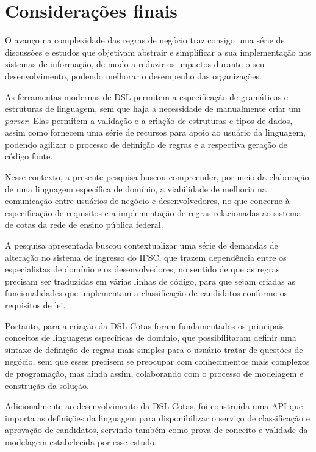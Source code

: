 \section{Considerações finais}
\label{considfinal}

O avanço na complexidade das regras de negócio traz consigo uma série de discussões e estudos que objetivam abstrair e simplificar a sua implementação nos sistemas de informação, de modo a reduzir os impactos durante o seu desenvolvimento, podendo melhorar o desempenho das organizações.

As ferramentas modernas de \gls{DSL} permitem a especificação de gramáticas e estruturas de linguagem, sem que haja a necessidade de manualmente criar um \textit{parser}. Elas permitem a validação e a criação de estruturas e tipos de dados, assim como fornecem uma série de recursos para apoio ao usuário da linguagem, podendo agilizar o processo de definição de regras e a respectiva geração de código fonte.

Nesse contexto, a presente pesquisa buscou compreender, por meio da elaboração de uma linguagem específica de domínio, a viabilidade de melhoria na comunicação entre usuários de negócio e desenvolvedores, no que concerne à especificação de requisitos e a implementação de regras relacionadas ao sistema de cotas da rede de ensino pública federal.

A pesquisa apresentada buscou contextualizar uma série de demandas de alteração no sistema de ingresso do \gls{IFSC}, que trazem dependência entre os especialistas de domínio e os desenvolvedores, no sentido de que as regras precisam ser traduzidas em várias linhas de código, para que sejam criadas as funcionalidades que implementam a classificação de candidatos conforme os requisitos de lei.

Portanto, para a criação da DSL Cotas foram fundamentados os principais conceitos de linguagens específicas de domínio, que possibilitaram definir uma sintaxe de definição de regras mais simples para o usuário tratar de questões de negócio, sem que esses precisem se preocupar com conhecimentos mais complexos de programação, mas ainda assim, colaborando com o processo de modelagem e construção da solução.

Adicionalmente ao desenvolvimento da DSL Cotas, foi construída uma \gls{API} que importa as definições da linguagem para disponibilizar o serviço de classificação e aprovação de candidatos, servindo também como prova de conceito e validade da modelagem estabelecida por esse estudo.

